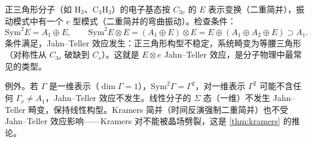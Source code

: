 \begin{example}
正三角形分子（如 $\mathrm{H_3}$、$\mathrm{C_3H_3}$）的电子基态按 $C_{3v}$ 的 $E$ 表示变换（二重简并），振动模式中有一个 $e$ 型模式（二重简并的弯曲振动）。检查条件：
\[
\mathrm{Sym}^2 E = A_1\oplus E,\qquad \mathrm{Sym}^2 E\otimes E = (A_1\oplus E)\otimes E = E\oplus(A_1\oplus A_2\oplus E)\supset A_1.
\]
条件满足，Jahn--Teller 效应发生：正三角形构型不稳定，系统畸变为等腰三角形（对称性从 $C_{3v}$ 破缺到 $C_s$）。这就是 $E\otimes e$ Jahn--Teller 效应，是分子物理中最常见的类型。

例外。若 $\Gamma$ 是一维表示（$\dim\Gamma=1$），$\mathrm{Sym}^2\Gamma=\Gamma^2$，对一维表示 $\Gamma^2$ 可能不含任何 $\Gamma_v\ne A_1$，Jahn--Teller 效应不发生。线性分子的 $\Sigma$ 态（一维）不发生 Jahn--Teller 畸变，保持线性构型。Kramers 简并（时间反演强制二重简并）也不受 Jahn--Teller 效应影响——Kramers 对不能被晶场劈裂，这是 \cref{thm:kramers} 的推论。
\end{example}


